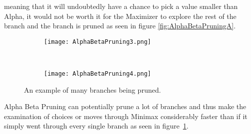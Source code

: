 meaning that it will undoubtedly have a chance to pick a value smaller than Alpha, 
it would not be worth it for the Maximizer to explore the rest of the branch and the branch is pruned as seen 
in figure \ref{fig:AlphaBetaPruningA}.
\begin{figure}[!t]
    \centering %
    \begin{subfigure}[t]{0.3\textwidth}
        \texttt{[image: AlphaBetaPruning3.png]}
    \end{subfigure}
    ~
    \begin{subfigure}[t]{0.3\textwidth}
        \texttt{[image: AlphaBetaPruning4.png]}
    \end{subfigure}
    \caption{An example of many branches being pruned.} %
    \label{fig:AlphaBetaPruningB}
  \end{figure}
Alpha Beta Pruning can potentially prune a lot of branches and 
thus make the examination of choices or moves through Minimax considerably faster 
than if it simply went through every single branch as seen in figure~\ref{fig:AlphaBetaPruningB}.
